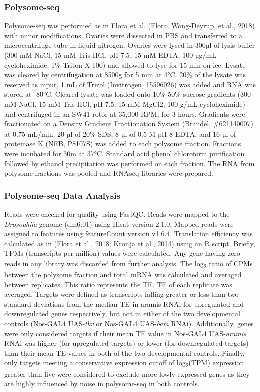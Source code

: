 \documentclass[12pt,oneside]{reedthesis}
\begin{document}
\hypertarget{polysome-seq}{%
\subsubsection{Polysome-seq}\label{polysome-seq}}

Polysome-seq was performed as in Flora et al. (Flora, Wong-Deyrup, et al., 2018) with minor modifications. Ovaries were dissected in PBS and transferred to a microcentrifuge tube in liquid nitrogen. Ovaries were lysed in 300µl of lysis buffer (300 mM NaCl, 15 mM Tris-HCl, pH 7.5, 15 mM EDTA, 100 µg/mL cycloheximide, 1\% Triton X-100) and allowed to lyse for 15 min on ice. Lysate was cleared by centrifugation at 8500g for 5 min at 4°C. 20\% of the lysate was reserved as input, 1 mL of Trizol (Invitrogen, 15596026) was added and RNA was stored at -80°C. Cleared lysate was loaded onto 10\%-50\% sucrose gradients (300 mM NaCl, 15 mM Tris-HCl, pH 7.5, 15 mM MgCl2, 100 g/mL cycloheximide) and centrifuged in an SW41 rotor at 35,000 RPM, for 3 hours. Gradients were fractionated on a Density Gradient Fractionation System (Brandel, \#621140007) at 0.75 mL/min, 20 µl of 20\% SDS, 8 µl of 0.5 M pH 8 EDTA, and 16 µl of proteinase K (NEB, P8107S) was added to each polysome fraction. Fractions were incubated for 30m at 37°C. Standard acid phenol chloroform purification followed by ethanol precipitation was performed on each fraction. The RNA from polysome fractions was pooled and RNAseq libraries were prepared.

\hypertarget{polysome-seq-data-analysis}{%
\subsubsection{Polysome-seq Data Analysis}\label{polysome-seq-data-analysis}}

Reads were checked for quality using FastQC. Reads were mapped to the \emph{Drosophila} genome (dm6.01) using Hisat version 2.1.0. Mapped reads were assigned to features using featureCount version v1.6.4. Translation efficiency was calculated as in (Flora et al., 2018; Kronja et al., 2014) using an R script. Briefly, TPMs (transcripts per million) values were calculated. Any gene having zero reads in any library was discarded from further analysis. The log\textsubscript{2} ratio of CPMs between the polysome fraction and total mRNA was calculated and averaged between replicates. This ratio represents the TE. TE of each replicate was averaged. Targets were defined as transcripts falling greater or less than two standard deviations from the median TE in aramis RNAi for upregulated and downregulated genes respectively, but not in either of the two developmental controls (Nos-GAL4 UAS-\emph{tkv} or Nos-GAL4 UAS-\emph{bam} RNAi). Additionally, genes were only considered targets if their mean TE value in Nos-GAL4 UAS-\emph{aramis} RNAi was higher (for upregulated targets) or lower (for downregulated targets) than their mean TE values in both of the two developmental controls. Finally, only targets meeting a conservative expression cutoff of log\textsubscript{2}(TPM) expression greater than five were considered to exclude more lowly expressed genes as they are highly influenced by noise in polysome-seq in both controls.
\end{document}
